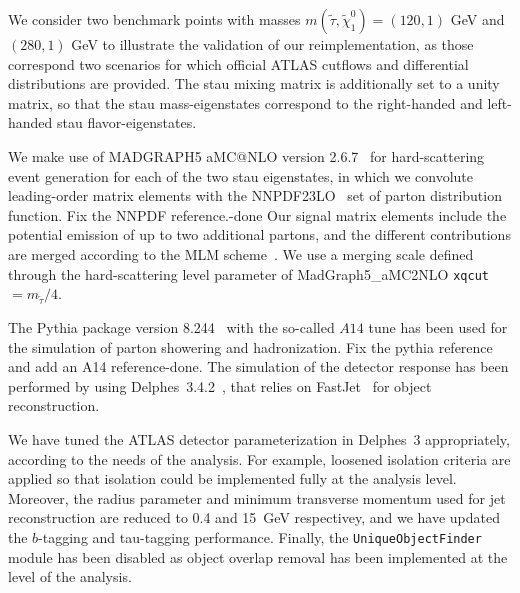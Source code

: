 \documentclass{ws-mpla}
\begin{document}
We consider two benchmark points with masses $m(\tilde{\tau},\tilde{\chi}^0_1)=(120,1)$ GeV and $(280,1)$ GeV to illustrate the validation of our reimplementation, as those correspond two scenarios for which official ATLAS cutflows and differential distributions are provided.
The stau mixing matrix is additionally set to a unity matrix, so that the stau mass-eigenstates correspond to the right-handed and left-handed stau flavor-eigenstates.

We make use of MADGRAPH5 aMC@NLO version 2.6.7~\cite{Alwall:2014hca} for hard-scattering event generation for each of the two stau eigenstates, in which we convolute leading-order matrix elements with the NNPDF23LO~\cite{Ball:2012cx} set of parton distribution function.  {\color{blue} Fix the NNPDF reference.-done}
Our signal matrix elements include the potential emission of up to two additional partons, and the different contributions are merged according to the MLM scheme~\cite{Mangano:2006rw,Alwall:2008qv}. We use a merging scale defined through the hard-scattering level parameter of {\sc MadGraph5\_aMC2NLO} {\tt xqcut} $= m_{\tilde{\tau}}/4$.

The {\sc Pythia} package version 8.244~\cite{Sjostrand:2014zea} with the so-called $A14$ tune\cite{TheATLAScollaboration:2014rfk} has been used for the simulation of parton showering and hadronization. {\color{blue}Fix the pythia reference and add an A14 reference-done}. The simulation of the detector response has been performed by using {\sc Delphes}~3.4.2~\cite{deFavereau:2013fsa}, that relies on {\sc FastJet}~\cite{Cacciari:2011ma} for object reconstruction.

We have tuned the ATLAS detector parameterization in {\sc Delphes}~3 appropriately, according to the needs of the analysis.
For example, loosened isolation criteria are applied so that isolation could be implemented fully at the analysis level.
Moreover, the radius parameter and minimum transverse momentum used for jet reconstruction are reduced to 0.4 and 15~GeV respectivey, and we have updated the $b$-tagging and tau-tagging performance.
Finally, the {\tt UniqueObjectFinder} module has been disabled as object overlap removal has been implemented at the level of the analysis.
\end{document}
